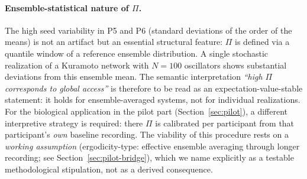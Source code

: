 ﻿\documentclass[11pt,a4paper]{article}
\theoremstyle{plain}
\theoremstyle{definition}
\theoremstyle{remark}
\begin{document}
\paragraph{Ensemble-statistical nature of $\Pi$.} The high seed variability in P5 and P6 (standard deviations of the order of the means) is not an artifact but an essential structural feature: $\Pi$ is defined via a quantile window of a reference ensemble distribution. A single stochastic realization of a Kuramoto network with $N = 100$ oscillators shows substantial deviations from this ensemble mean. The semantic interpretation \emph{``high $\Pi$ corresponds to global access''} is therefore to be read as an expectation-value-stable statement: it holds for ensemble-averaged systems, not for individual realizations. For the biological application in the pilot part (Section~\ref{sec:pilot}), a different interpretive strategy is required: there $\Pi$ is calibrated per participant from that participant's \emph{own} baseline recording. The viability of this procedure rests on a \emph{working assumption} (ergodicity-type: effective ensemble averaging through longer recording; see Section~\ref{sec:pilot-bridge}), which we name explicitly as a testable methodological stipulation, not as a derived consequence.
\end{document}
